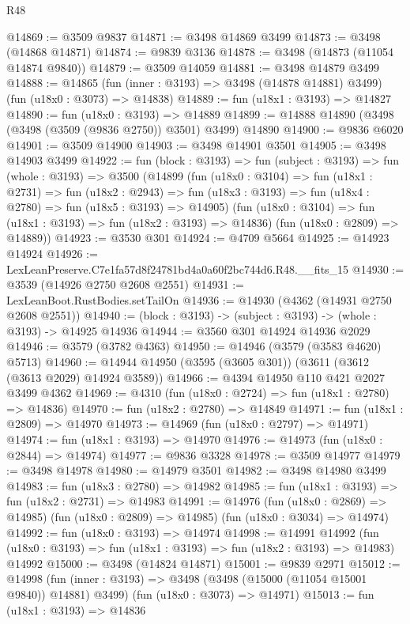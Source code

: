 \begin{lexlean}{R48}
\begin{coremodule}
@14869 := @3509 @9837
@14871 := @3498 @14869 @3499
@14873 := @3498 (@14868 @14871)
@14874 := @9839 @3136
@14878 := @3498 (@14873 (@11054 @14874 @9840))
@14879 := @3509 @14059
@14881 := @3498 @14879 @3499
@14888 := @14865
    (fun (inner : @3193) => @3498 (@14878 @14881) @3499)
    (fun (u18x0 : @3073) => @14838)
@14889 := fun (u18x1 : @3193) => @14827
@14890 := fun (u18x0 : @3193) => @14889
@14899 := @14888 @14890 (@3498 (@3498 (@3509 (@9836 @2750)) @3501) @3499) @14890
@14900 := @9836 @6020
@14901 := @3509 @14900
@14903 := @3498 @14901 @3501
@14905 := @3498 @14903 @3499
@14922 := fun (block : @3193) =>
  fun (subject : @3193) =>
  fun (whole : @3193) =>
  @3500
    (@14899
      (fun (u18x0 : @3104) =>
      fun (u18x1 : @2731) =>
      fun (u18x2 : @2943) =>
      fun (u18x3 : @3193) => fun (u18x4 : @2780) => fun (u18x5 : @3193) => @14905)
      (fun (u18x0 : @3104) => fun (u18x1 : @3193) => fun (u18x2 : @3193) => @14836)
      (fun (u18x0 : @2809) => @14889))
@14923 := @3530 @301
@14924 := @4709 @5664
@14925 := @14923 @14924
@14926 := LexLeanPreserve.C7e1fa57d8f24781bd4a0a60f2bc744d6.R48.__fits_15
@14930 := @3539 (@14926 @2750 @2608 @2551)
@14931 := LexLeanBoot.RustBodies.setTailOn
@14936 := @14930 (@4362 (@14931 @2750 @2608 @2551))
@14940 := (block : @3193) -> (subject : @3193) -> (whole : @3193) -> @14925 @14936
@14944 := @3560 @301 @14924 @14936 @2029
@14946 := @3579 (@3782 @4363)
@14950 := @14946 (@3579 (@3583 @4620) @5713)
@14960 := @14944 @14950 (@3595 (@3605 @301)) (@3611 (@3612 (@3613 @2029) @14924 @3589))
@14966 := @4394 @14950 @110 @421 @2027 @3499 @4362
@14969 := @4310 (fun (u18x0 : @2724) => fun (u18x1 : @2780) => @14836)
@14970 := fun (u18x2 : @2780) => @14849
@14971 := fun (u18x1 : @2809) => @14970
@14973 := @14969 (fun (u18x0 : @2797) => @14971)
@14974 := fun (u18x1 : @3193) => @14970
@14976 := @14973 (fun (u18x0 : @2844) => @14974)
@14977 := @9836 @3328
@14978 := @3509 @14977
@14979 := @3498 @14978
@14980 := @14979 @3501
@14982 := @3498 @14980 @3499
@14983 := fun (u18x3 : @2780) => @14982
@14985 := fun (u18x1 : @3193) => fun (u18x2 : @2731) => @14983
@14991 := @14976
    (fun (u18x0 : @2869) => @14985)
    (fun (u18x0 : @2809) => @14985)
    (fun (u18x0 : @3034) => @14974)
@14992 := fun (u18x0 : @3193) => @14974
@14998 := @14991
    @14992
    (fun (u18x0 : @3193) => fun (u18x1 : @3193) => fun (u18x2 : @3193) => @14983)
    @14992
@15000 := @3498 (@14824 @14871)
@15001 := @9839 @2971
@15012 := @14998
    (fun (inner : @3193) => @3498 (@3498 (@15000 (@11054 @15001 @9840)) @14881) @3499)
    (fun (u18x0 : @3073) => @14971)
@15013 := fun (u18x1 : @3193) => @14836

\end{coremodule}
\end{lexlean}
